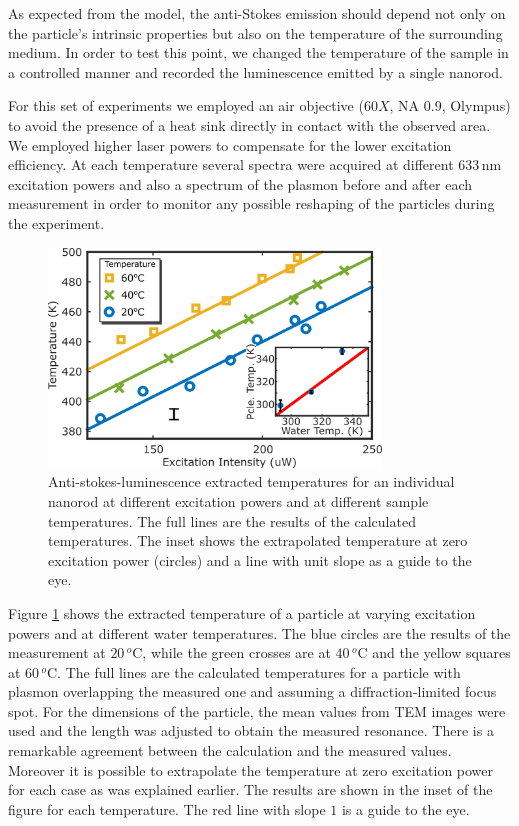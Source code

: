 \documentclass[journal=nalefd,manuscript=letter]{achemso}
\newcommand{\nm}{\ensuremath{\,\textrm{nm}}}
\newcommand{\degree}{\ensuremath{\,^o\textrm{C}}}
\begin{document}
As expected from the model, the anti-Stokes emission should depend not only on
the particle's intrinsic properties but also on the temperature of the
surrounding medium\cite{Konrad2013}. In order to test this point, we changed the temperature of 
the sample in a controlled manner and recorded the luminescence emitted by a single nanorod. 

For this set of experiments we employed an air objective ($60X$, NA $0.9$, Olympus)
to avoid the presence of a heat sink directly in contact with the observed area. 
We employed higher laser powers to compensate for the lower
excitation efficiency. At each temperature several spectra were acquired at
different $633\nm$ excitation powers and also a spectrum of the plasmon before
and after each measurement in order to monitor any possible reshaping of the
particles during the experiment.

\begin{figure}[tp] \centering
\includegraphics[width=88.4mm]{Figures/03_Fit_Of_AS/03_Log_Fit_AS_02.png}
\caption{Anti-stokes-luminescence extracted temperatures for an individual nanorod
at different excitation powers and at different sample temperatures. 
The full lines are the results of the calculated temperatures. The inset shows the extrapolated temperature at zero
excitation power (circles) and a line with unit slope as a guide to the eye.}
	\label{fig:AS_temp}
\end{figure}


Figure \ref{fig:AS_temp} shows the extracted temperature of a particle at
varying excitation powers and at different water temperatures. The blue circles
are the results of the measurement at $20\degree$, while the green crosses are
at $40\degree$ and the yellow squares at $60\degree$. The full lines are the
calculated temperatures for a particle with plasmon overlapping the measured one
and assuming a diffraction-limited focus spot. For the dimensions of the
particle, the mean values from TEM images were used and the length was adjusted
to obtain the measured resonance. There is a remarkable agreement between the
calculation and the measured values. Moreover it is possible to extrapolate the
temperature at zero excitation power for each case as was explained earlier. The
results are shown in the inset of the figure for each temperature. The red line
with slope $1$ is a guide to the eye.
\end{document}
